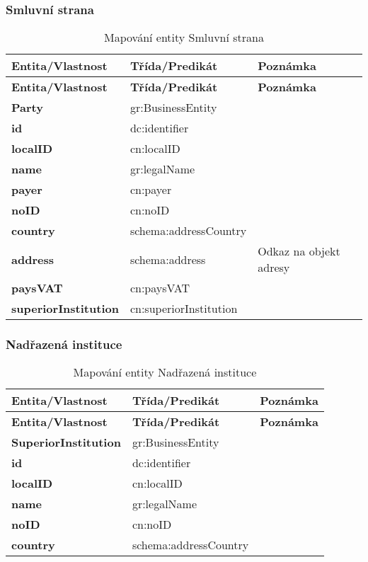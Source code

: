 \subsubsection*{Smluvní strana}

\begin{center}
\begin{longtable}{lp{30mm}p{65mm}}
\label{grid_mlmmh} \\
\multicolumn{1}{l}{\textbf{Entita/Vlastnost}} & 
\multicolumn{1}{l}{\textbf{Třída/Predikát}} & 
\multicolumn{1}{l}{\textbf{Poznámka}} \\ \hline 
\endfirsthead
\multicolumn{1}{l}{\textbf{Entita/Vlastnost}} & 
\multicolumn{1}{l}{\textbf{Třída/Predikát}} & 
\multicolumn{1}{l}{\textbf{Poznámka}} \\ \hline 
\hline
\endhead
\endfoot
\caption{Mapování entity Smluvní strana}
\endlastfoot
\textbf{Party} & gr:BusinessEntity \\
\textbf{id} & dc:identifier \\
\textbf{localID} & cn:localID \\
\textbf{name} & gr:legalName \\
\textbf{payer} & cn:payer \\
\textbf{noID} & cn:noID \\
\textbf{country} & schema:addressCountry \\
\textbf{address} & schema:address & Odkaz na objekt adresy \\
\textbf{paysVAT} & cn:paysVAT \\
\textbf{superiorInstitution} & cn:superiorInstitution \\
\end{longtable}
\end{center}

\subsubsection*{Nadřazená instituce}

\begin{center}
\begin{longtable}{lp{30mm}p{65mm}}
\label{grid_mlmmh} \\
\multicolumn{1}{l}{\textbf{Entita/Vlastnost}} & 
\multicolumn{1}{l}{\textbf{Třída/Predikát}} & 
\multicolumn{1}{l}{\textbf{Poznámka}} \\ \hline 
\endfirsthead
\multicolumn{1}{l}{\textbf{Entita/Vlastnost}} & 
\multicolumn{1}{l}{\textbf{Třída/Predikát}} & 
\multicolumn{1}{l}{\textbf{Poznámka}} \\ \hline 
\hline
\endhead
\endfoot
\caption{Mapování entity Nadřazená instituce}
\endlastfoot
\textbf{SuperiorInstitution} & gr:BusinessEntity & \\
\textbf{id} & dc:identifier \\
\textbf{localID} & cn:localID \\
\textbf{name} & gr:legalName \\
\textbf{noID} & cn:noID \\
\textbf{country} & schema:addressCountry \\
\end{longtable}
\end{center}

